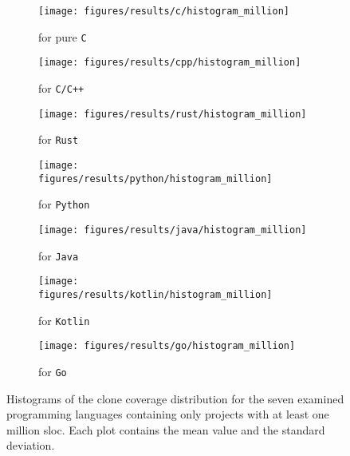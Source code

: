 \begin{figure}[p]
	\centering
	\begin{subfigure}[t]{0.49\textwidth}
		\texttt{[image: figures/results/c/histogram\_million]}
		\caption{for pure \texttt{C}}
		\label{fig:histo_million_c}
	\end{subfigure}
	\hfill
	\begin{subfigure}[t]{0.49\textwidth}
		\texttt{[image: figures/results/cpp/histogram\_million]}
		\caption{for \texttt{C/C++}}
		\label{fig:histo_million_cpp}
	\end{subfigure}
	\begin{subfigure}[t]{0.49\textwidth}
		\texttt{[image: figures/results/rust/histogram\_million]}
		\caption{for \texttt{Rust}}
		\label{fig:histo_million_rust}
	\end{subfigure}
	\begin{subfigure}[t]{0.49\textwidth}
		\texttt{[image: figures/results/python/histogram\_million]}
		\caption{for \texttt{Python}}
		\label{fig:histo_million_python}
	\end{subfigure}
	\begin{subfigure}[t]{0.49\textwidth}
		\texttt{[image: figures/results/java/histogram\_million]}
		\caption{for \texttt{Java}}
		\label{fig:histo_million_java}
	\end{subfigure}
	\begin{subfigure}[t]{0.49\textwidth}
		\texttt{[image: figures/results/kotlin/histogram\_million]}
		\caption{for \texttt{Kotlin}}
		\label{fig:histo_million_kotlin}
	\end{subfigure}
	\begin{subfigure}[t]{0.49\textwidth}
		\texttt{[image: figures/results/go/histogram\_million]}
		\caption{for \texttt{Go}}
		\label{fig:histo_million_go}
	\end{subfigure}
	\caption{Histograms of the clone coverage distribution for the seven examined programming languages containing only projects with at least one million \ac{sloc}. Each plot contains the mean value and the standard deviation.}
	\label{fig:histo_million}
\end{figure}
